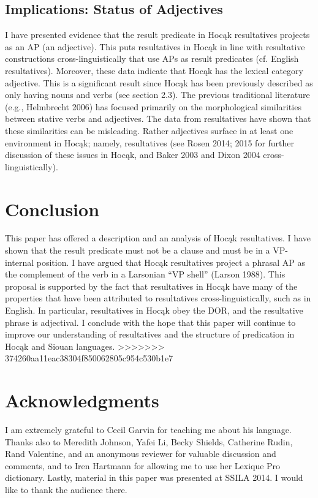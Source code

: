 \documentclass[output=paper]{LSP/langsci}
\begin{document}
\begin{exe}
\begin{exe}
\begin{exe}
\begin{exe}
{\begin{exe}
\subsection{Implications: Status of Adjectives}

I have presented evidence that the result predicate in Hoc\k{a}k resultatives projects as an AP (an adjective). This puts resultatives in Hoc\k{a}k in line with resultative constructions cross-linguistically that use APs as result predicates (cf. English resultatives). Moreover, these data indicate that Hoc\k{a}k has the lexical category adjective. This is a significant result since Hoc\k{a}k has been previously described as only having nouns and verbs (see section 2.3). The previous traditional literature (e.g., Helmbrecht 2006) has focused primarily on the morphological similarities between stative verbs and adjectives. The data from resultatives have shown that these similarities can be misleading. Rather adjectives surface in at least one environment in Hoc\k{a}k; namely, resultatives (see Rosen 2014; 2015 for further discussion of these issues in Hoc\k{a}k, and Baker 2003 and Dixon 2004 cross-linguistically).

\section{Conclusion}
This paper has offered a description and an analysis of Hoc\k{a}k resultatives. I have shown that the result predicate must not be a clause and must be in a VP-internal position. I have argued that Hoc\k{a}k resultatives project a phrasal AP as the complement of the verb in a Larsonian ``VP shell'' (Larson 1988). This proposal is supported by the fact that resultatives in Hoc\k{a}k have many of the properties that have been attributed to resultatives cross-linguistically, such as in English. In particular, resultatives in Hoc\k{a}k obey the DOR, and the resultative phrase is adjectival. I conclude with the hope that this paper will continue to improve our understanding of resultatives and the structure of predication in Hoc\k{a}k and Siouan languages.
>>>>>>> 374260aa11eac38304f850062805c954c530b1e7

\section* {Acknowledgments}
I am extremely grateful to Cecil Garvin for teaching me about his language. Thanks also to Meredith Johnson, Yafei Li, Becky Shields, Catherine Rudin, Rand Valentine, and an anonymous reviewer for valuable discussion and comments, and to Iren Hartmann for allowing me to use her Lexique Pro dictionary. Lastly, material in this paper was presented at SSILA 2014. I would like to thank the audience there.


\end{exe}}
\end{exe}
\end{exe}
\end{exe}
\end{exe}
\end{document}
